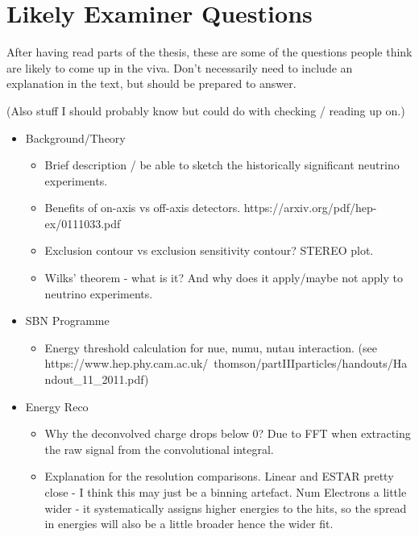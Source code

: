 \chapter{Likely Examiner Questions}\label{Likely Examiner Questions}

After having read parts of the thesis, these are some of the questions people think are likely to come up in the viva. Don't necessarily need to include an explanation in the text, but should be prepared to answer.

(Also stuff I should probably know but could do with checking / reading up on.)

\begin{itemize}
    \item Background/Theory
    \begin{itemize}
        \item Brief description / be able to sketch the historically significant neutrino experiments.
        \item Benefits of on-axis vs off-axis detectors. https://arxiv.org/pdf/hep-ex/0111033.pdf
        \item Exclusion contour vs exclusion sensitivity contour? STEREO plot.
        \item Wilks' theorem - what is it? And why does it apply/maybe not apply to neutrino experiments.
    \end{itemize}
    
    \item SBN Programme
    \begin{itemize}
        \item Energy threshold calculation for nue, numu, nutau interaction. (see https://www.hep.phy.cam.ac.uk/~thomson/partIIIparticles/handouts/Handout\_11\_2011.pdf)
    \end{itemize}
    
    \item Energy Reco
    \begin{itemize}
        \item Why the deconvolved charge drops below 0? Due to FFT when extracting the raw signal from the convolutional integral.
        \item Explanation for the resolution comparisons. Linear and ESTAR pretty close - I think this may just be a binning artefact. Num Electrons a little wider - it systematically assigns higher energies to the hits, so the spread in energies will also be a little broader hence the wider fit. 
    \end{itemize}
    

\end{itemize}
